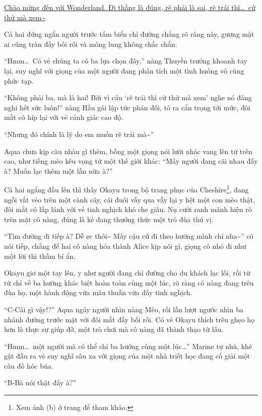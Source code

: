 \documentclass[../main.tex]{subfiles}
\begin{document}
\begin{center}
  \uline{Chào mừng đến với Wonderland. Đi thẳng là đúng, rẽ phải là sai, rẽ trái thì\dots\ cứ thử mà xem\~{}}
\end{center}

Cả hai đứng ngẩn người trước tấm biển chỉ đường chẳng rõ ràng này, gương mặt ai cũng tràn đầy bối rối và mông lung không chắc chắn.

``Hmm\dots\ Có vẻ chúng ta có ba lựa chọn đây,'' nàng Thuyền trưởng khoanh tay lại, suy nghĩ với giọng của một người đang phân tích một tình huống vô cùng phức tạp.

``Không phải ba, mà là hai! Bởi vì câu `rẽ trái thì cứ thử mà xem' nghe nó đáng nghi hết sức luôn!'' nàng Hầu gái lập tức phản đối, tỏ ra cẩn trọng tới mức, đôi mắt cô híp lại với vẻ cảnh giác cao độ.

``Nhưng đó chính là lý do em muốn rẽ trái mà\~{}''

Aqua chưa kịp càu nhàu gì thêm, bỗng một giọng nói lười nhác vang lên từ trên cao, như tiếng mèo kêu vọng từ một thế giới khác: ``Mấy người đang cãi nhau đấy à? Muốn lạc thêm một lần nữa à?''

Cả hai ngẩng đầu lên thì thấy Okayu trong bộ trang phục của Cheshire\footnote{Xem ảnh (b) ở trang \pageref{wonderland} để tham khảo.}, đang ngồi vắt vẻo trên một cành cây, cái đuôi vẫy qua vẫy lại y hệt một con mèo thật, đôi mắt cô lấp lánh với vẻ tinh nghịch khó che giấu. Nụ cười ranh mãnh hiện rõ trên mặt cô nàng, đúng là kẻ đang thưởng thức một trò đùa thú vị.

``Tìm đường đi tiếp à? Dễ ẹc thôi\~{} Mấy cậu cứ đi theo hướng mình chỉ nha\~{}'' cô nói tiếp, chẳng để hai cô nàng hóa thành Alice kịp nói gì, giọng cô nhỏ đi như một lời thì thầm bí ẩn.

Okayu giơ một tay lên, y như người đang chỉ đường cho du khách lạc lối, rồi từ từ chỉ về ba hướng khác biệt hoàn toàn cùng một lúc, rõ ràng cô nàng đang trêu đùa họ, một hành động vừa mâu thuẫn vừa đầy tinh nghịch.

``C-Cái gì vậy!?'' Aqua ngây người nhìn nàng Mèo, rồi lần lượt ngước nhìn ba nhánh đường trước mặt với đôi mắt đầy bối rối. Có vẻ Okayu thích trêu ghẹo họ hơn là thực sự giúp đỡ, một trò chơi mà cô nàng đã thành thạo từ lâu.

``Hmm\dots\ một người mà có thể chỉ ba hướng cùng một lúc\dots'' Marine tự nhủ, khẽ gật đầu ra vẻ suy nghĩ sâu xa với giọng của một nhà triết học đang cố giải một câu đố hóc búa.

``B-Bà nói thật đấy à?''
\end{document}
